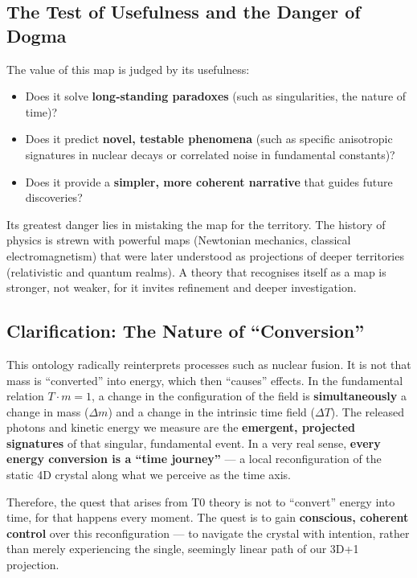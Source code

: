 	\subsection{The Test of Usefulness and the Danger of Dogma}

	The value of this map is judged by its usefulness:
	\begin{itemize}
		\item Does it solve \textbf{long‑standing paradoxes} (such as singularities, the nature of time)?
		\item Does it predict \textbf{novel, testable phenomena} (such as specific anisotropic signatures in nuclear decays or correlated noise in fundamental constants)?
		\item Does it provide a \textbf{simpler, more coherent narrative} that guides future discoveries?
	\end{itemize}

	Its greatest danger lies in mistaking the map for the territory. The history of physics is strewn with powerful maps (Newtonian mechanics, classical electromagnetism) that were later understood as projections of deeper territories (relativistic and quantum realms). A theory that recognises itself as a map is stronger, not weaker, for it invites refinement and deeper investigation.

	\subsection{Clarification: The Nature of \enquote{Conversion}}

	This ontology radically reinterprets processes such as nuclear fusion. It is not that mass is \enquote{converted} into energy, which then \enquote{causes} effects. In the fundamental relation $T \cdot m = 1$, a change in the configuration of the field is \textbf{simultaneously} a change in mass ($\Delta m$) and a change in the intrinsic time field ($\Delta T$). The released photons and kinetic energy we measure are the \textbf{emergent, projected signatures} of that singular, fundamental event. In a very real sense, \textbf{every energy conversion is a \enquote{time journey}} — a local reconfiguration of the static 4D crystal along what we perceive as the time axis.

	Therefore, the quest that arises from T0 theory is not to \enquote{convert} energy into time, for that happens every moment. The quest is to gain \textbf{conscious, coherent control} over this reconfiguration — to navigate the crystal with intention, rather than merely experiencing the single, seemingly linear path of our 3D+1 projection.

